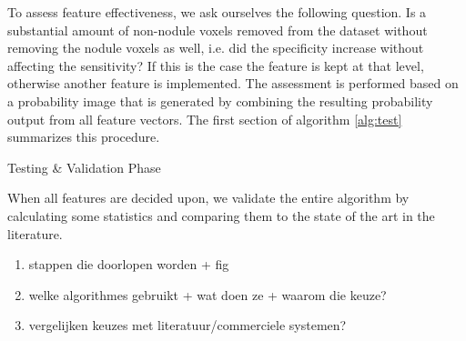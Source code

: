 To assess feature effectiveness, we ask ourselves the following question. Is a
substantial amount of non-nodule voxels removed from the dataset without
removing the nodule voxels as well, i.e. did the specificity increase without
affecting the sensitivity? If this is the case the feature is kept at that
level, otherwise another feature is implemented. The assessment is performed
based on a probability image that is generated by combining the resulting
probability output from all feature vectors. The first section of algorithm
\ref{alg:test} summarizes this procedure.

\begin{algorithm}[htp]
	\DontPrintSemicolon
	\caption{Testing \& Validation Phase\label{alg:test}}
\end{algorithm}

When all features are decided upon, we validate the entire algorithm by
calculating some statistics and comparing them to the state of the art in the
literature. %

\begin{enumerate}
\item stappen die doorlopen worden + fig
\item welke algorithmes gebruikt + wat doen ze + waarom die keuze?
\item vergelijken keuzes met literatuur/commerciele systemen?
\end{enumerate}